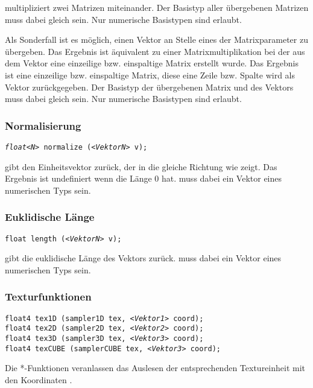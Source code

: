  multipliziert zwei Matrizen miteinander. Der Basistyp aller
übergebenen Matrizen muss dabei gleich sein. Nur numerische Basistypen
sind erlaubt.

Als Sonderfall ist es möglich, einen Vektor an Stelle eines der Matrixparameter zu
übergeben. Das Ergebnis ist äquivalent zu einer Matrixmultiplikation bei der
aus dem Vektor eine einzeilige bzw. einspaltige Matrix erstellt wurde. Das
Ergebnis ist eine einzeilige bzw. einspaltige Matrix, diese eine Zeile bzw.
Spalte wird als Vektor zurückgegeben. Der Basistyp der übergebenen Matrix
und des Vektors muss dabei gleich sein. Nur numerische Basistypen sind erlaubt.

\subsubsection{Normalisierung}

\texttt{\emph{float<N>} normalize (\emph{<VektorN>} v);}

 gibt den Einheitsvektor zurück, der in die gleiche Richtung wie
 zeigt. Das Ergebnis ist undefiniert wenn  die Länge $0$ hat.
 muss dabei ein Vektor eines numerischen Typs sein.

\subsubsection{Euklidische Länge}

\texttt{float length (\emph{<VektorN>} v);}

 gibt die euklidische Länge des Vektors  zurück.
 muss dabei ein Vektor eines numerischen Typs sein.

\subsubsection{Texturfunktionen}
\label{Texturfunktionen}

\texttt{float4 tex1D (sampler1D tex, \emph{<Vektor1>} coord);}\\
\texttt{float4 tex2D (sampler2D tex, \emph{<Vektor2>} coord);}\\
\texttt{float4 tex3D (sampler3D tex, \emph{<Vektor3>} coord);}\\
\texttt{float4 texCUBE (samplerCUBE tex, \emph{<Vektor3>} coord);}

Die *-Funktionen veranlassen das Auslesen der  entsprechenden
Textureinheit mit den Koordinaten .


